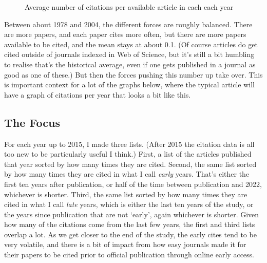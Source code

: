 \documentclass[
  10pt,
  letterpaper,
  DIV=11,
  numbers=noendperiod,
  twoside]{scrartcl}
\begin{document}
\begin{figure}


\caption{\label{fig-average-of-citations-by-year}Average number of
citations per available article in each each year}

\end{figure}%

Between about 1978 and 2004, the different forces are roughly balanced.
There are more papers, and each paper cites more often, but there are
more papers available to be cited, and the mean stays at about 0.1. (Of
course articles do get cited outside of journals indexed in Web of
Science, but it's still a bit humbling to realise that's the historical
average, even if one gets published in a journal as good as one of
these.) But then the forces pushing this number up take over. This is
important context for a lot of the graphs below, where the typical
article will have a graph of citations per year that looks a bit like
this.

\subsection{The Focus}\label{sec-focus}

For each year up to 2015, I made three lists. (After 2015 the citation
data is all too new to be particularly useful I think.) First, a list of
the articles published that year sorted by how many times they are
cited. Second, the same list sorted by how many times they are cited in
what I call \emph{early} years. That's either the first ten years after
publication, or half of the time between publication and 2022, whichever
is shorter. Third, the same list sorted by how many times they are cited
in what I call \emph{late} years, which is either the last ten years of
the study, or the years since publication that are not `early', again
whichever is shorter. Given how many of the citations come from the last
few years, the first and third lists overlap a lot. As we get closer to
the end of the study, the early cites tend to be very volatile, and
there is a bit of impact from how easy journals made it for their papers
to be cited prior to official publication through online early access.
\end{document}
